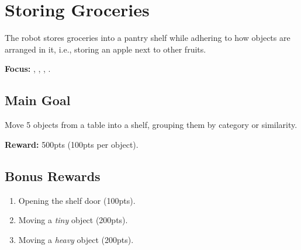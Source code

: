 \section{Storing Groceries}
\label{test:storing-groceries}
The robot stores groceries into a pantry shelf while adhering to how objects are arranged in it, i.e., storing an apple next to other fruits.

\noindent \textbf{Focus:} \SysI, \MAN, \CV, \OR.


\subsection*{Main Goal}
Move 5 objects from a table into a shelf, grouping them by category or similarity.

\noindent\textbf{Reward:} 500pts (100pts per object).

\subsection*{Bonus Rewards}
\begin{enumerate}[nosep]
	\item Opening the shelf door (100pts).
	\item Moving a \emph{tiny} object (200pts).
	\item Moving a \emph{heavy} object (200pts).
\end{enumerate}

%
%
